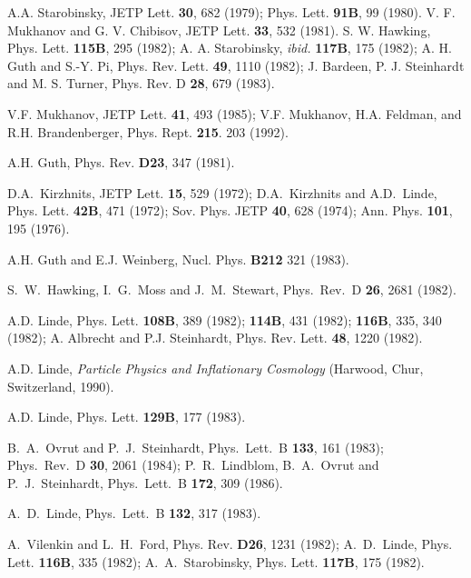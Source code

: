 \documentclass[a4paper,12pt]{article}
\begin{document}
\begin{thebibliography}{99}

 A.A. Starobinsky, JETP Lett. {\bf 30}, 682  (1979); Phys.
Lett. {\bf 91B}, 99  (1980).
 V. F. Mukhanov and G. V. Chibisov, JETP  Lett. {\bf 33}, 532
(1981).
 S. W. Hawking, Phys. Lett. {\bf 115B}, 295 (1982); A. A.
Starobinsky, {\it ibid.} {\bf 117B}, 175 (1982); A. H. Guth and S.-Y. Pi,
Phys. Rev. Lett. {\bf 49}, 1110 (1982); J. Bardeen, P. J. Steinhardt and
M. S. Turner, Phys. Rev. D {\bf 28}, 679 (1983).

 V.F. Mukhanov, JETP Lett. {\bf 41},  493 (1985);
V.F. Mukhanov, H.A. Feldman, and R.H. Brandenberger, Phys. Rept. {\bf
215}. 203 (1992).

 A.H. Guth, Phys. Rev. {\bf D23}, 347  (1981).


 D.A.~Kirzhnits, JETP Lett. {\bf 15}, 529 (1972);
D.A.~Kirzhnits and A.D.~Linde, Phys. Lett. {\bf 42B}, 471 (1972); Sov.
Phys. JETP {\bf 40}, 628 (1974); Ann. Phys. {\bf 101}, 195 (1976).


 A.H. Guth and E.J. Weinberg,  Nucl. Phys. {\bf B212} 321 (1983).

S.~W.~Hawking, I.~G.~Moss and J.~M.~Stewart,
Phys.\ Rev.\ D {\bf 26}, 2681 (1982).




 A.D. Linde, Phys. Lett. {\bf 108B}, 389 (1982); {\bf
114B},  431 (1982); {\bf 116B}, 335, 340  (1982); A. Albrecht and P.J.
Steinhardt, Phys. Rev. Lett. {\bf 48}, 1220 (1982).

 A.D. Linde,  {\it  Particle  Physics  and
Inflationary Cosmology} (Harwood, Chur, Switzerland, 1990).


 A.D. Linde, Phys. Lett. {\bf 129B},  177 (1983).

B.~A.~Ovrut and P.~J.~Steinhardt,
Phys.\ Lett.\ B {\bf 133}, 161 (1983); Phys.\ Rev.\ D {\bf 30}, 2061 (1984); P.~R.~Lindblom, B.~A.~Ovrut and P.~J.~Steinhardt,
Phys.\ Lett.\ B {\bf 172}, 309 (1986).

A.~D.~Linde,
Phys.\ Lett.\ B {\bf 132}, 317 (1983).

 A.~Vilenkin and L.~H.~Ford, Phys. Rev. {\bf D26}, 1231
(1982);  A.~D.~Linde, Phys. Lett. {\bf 116B}, 335 (1982);
A.~A.~Starobinsky, Phys. Lett. {\bf 117B}, 175 (1982).




\end{thebibliography}
\end{document}
